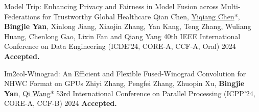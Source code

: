 \begin{cvpublications}

\cvpublication
{Model Trip: Enhancing Privacy and Fairness in Model Fusion across Multi-Federations for Trustworthy Global Healthcare} %
{Qian Chen, \underline{Yiqiang Chen}*, \textbf{Bingjie Yan}, Xinlong Jiang, Xiaojin Zhang, Yan Kang, Teng Zhang, Wuliang Huang, Chenlong Gao, Lixin Fan and Qiang Yang} %
{40th IEEE International Conference on Data Engineering (ICDE'24, CORE-A\ast, CCF-A, \textcolor{awesome}{Oral})} %
{2024} %
{\textbf{Accepted.}} %


\cvpublication
{Im2col-Winograd: An Efficient and Flexible Fused-Winograd Convolution for NHWC Format on GPUs} %
{Zhiyi Zhang, Pengfei Zhang, Zhuopin Xu, \textbf{Bingjie Yan}, \underline{Qi Wang}*} %
{53rd International Conference on Parallel Processing (ICPP'24, CORE-A, CCF-B)} %
{2024} %
{\textbf{Accepted.}} %

\end{cvpublications}

